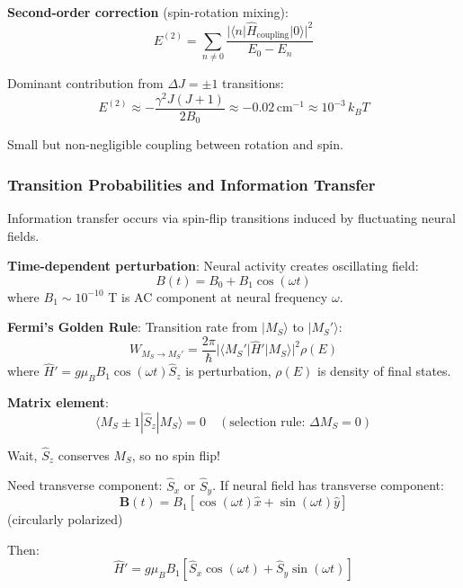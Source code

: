 \documentclass[11pt,onecolumn]{article}
\begin{document}
\textbf{Second-order correction} (spin-rotation mixing):
\begin{equation}
E^{(2)} = \sum_{n \neq 0} \frac{|\langle n | \hat{H}_{\text{coupling}} | 0 \rangle|^2}{E_0 - E_n}
\end{equation}

Dominant contribution from $\Delta J = \pm 1$ transitions:
\begin{equation}
E^{(2)} \approx -\frac{\gamma^2 J(J+1)}{2B_0} \approx -0.02\,\text{cm}^{-1} \approx 10^{-3}\,k_B T
\end{equation}

Small but non-negligible coupling between rotation and spin.

\subsubsection{Transition Probabilities and Information Transfer}

Information transfer occurs via spin-flip transitions induced by fluctuating neural fields.

\textbf{Time-dependent perturbation}:
Neural activity creates oscillating field:
\begin{equation}
B(t) = B_0 + B_1 \cos(\omega t)
\end{equation}
where $B_1 \sim 10^{-10}$ T is AC component at neural frequency $\omega$.

\textbf{Fermi's Golden Rule}:
Transition rate from $|M_S\rangle$ to $|M_S'\rangle$:
\begin{equation}
W_{M_S \to M_S'} = \frac{2\pi}{\hbar}|\langle M_S' | \hat{H}'| M_S\rangle|^2 \rho(E)
\end{equation}
where $\hat{H}' = g\mu_B B_1 \cos(\omega t) \hat{S}_z$ is perturbation, $\rho(E)$ is density of final states.

\textbf{Matrix element}:
\begin{equation}
\langle M_S \pm 1 | \hat{S}_z | M_S \rangle = 0 \quad (\text{selection rule: } \Delta M_S = 0)
\end{equation}

Wait, $\hat{S}_z$ conserves $M_S$, so no spin flip!

Need transverse component: $\hat{S}_x$ or $\hat{S}_y$. If neural field has transverse component:
\begin{equation}
\mathbf{B}(t) = B_1[\cos(\omega t)\hat{x} + \sin(\omega t)\hat{y}]
\end{equation}
(circularly polarized)

Then:
\begin{equation}
\hat{H}' = g\mu_B B_1[\hat{S}_x \cos(\omega t) + \hat{S}_y \sin(\omega t)]
\end{equation}
\end{document}
